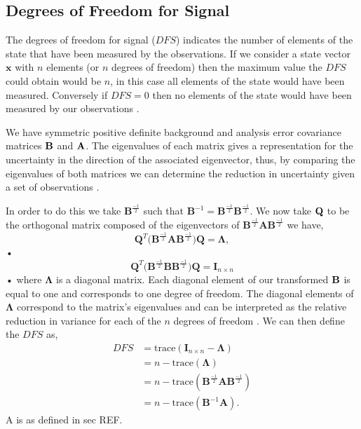 \documentclass[11pt]{article}
\begin{document}
\subsection{Degrees of Freedom for Signal} \label{DFSintro}%

The degrees of freedom for signal ($DFS$) indicates the number of elements of the state that have been measured by the observations. If we consider a state vector $\textbf{x}$ with $n$ elements (or $n$ degrees of freedom) then the maximum value the $DFS$ could obtain would be $n$, in this case all elements of the state would have been measured. Conversely if $DFS = 0$ then no elements of the state would have been measured by our observations \citep{Fowler2013}.

We have symmetric positive definite background and analysis error covariance matrices $\bf{B}$ and $\bf{A}$. The eigenvalues of each matrix gives a representation for the uncertainty in the direction of the associated eigenvector, thus, by comparing the eigenvalues of both matrices we can determine the reduction in uncertainty given a set of observations \citep{stewart2008correlated}.

In order to do this we take $\mathbf{B}^{\frac{-1}{2}}$ such that $\mathbf{B}^{-1} = \mathbf{B}^{\frac{-1}{2}}\mathbf{B}^{\frac{-1}{2}}$. We now take $\bf{Q}$ to be the orthogonal matrix composed of the eigenvectors of $\mathbf{B}^{\frac{-1}{2}}\mathbf{A}\mathbf{B}^{\frac{-1}{2}}$ we have,
\begin{equation}
\mathbf{Q}^{T}\bigg(\mathbf{B}^{\frac{-1}{2}}\mathbf{A}\mathbf{B}^{\frac{-1}{2}}\bigg)\mathbf{Q} = \bm{\Lambda},
\end{equation}• 
\begin{equation}
\mathbf{Q}^{T}\bigg(\mathbf{B}^{\frac{-1}{2}}\mathbf{B}\mathbf{B}^{\frac{-1}{2}}\bigg)\mathbf{Q} = \bm{I}_{n\times n}
\end{equation}•
where $\bm{\Lambda}$ is a diagonal matrix. Each diagonal element of our transformed $\bf{B}$ is equal to one and corresponds to one degree of freedom. The diagonal elements of $\bm{\Lambda}$ correspond to the matrix's eigenvalues and can be interpreted as the relative reduction in variance for each of the $n$ degrees of freedom \cite{singh2013practical}. We can then define the $DFS$ as,
\begin{equation}
\begin{split}
DFS & = \text{trace}(\mathbf{I}_{n\times n} - \bm{\Lambda}) \\
       & = n - \text{trace}(\bm{\Lambda}) \\
       & = n - \text{trace}(\mathbf{B}^{\frac{-1}{2}}\mathbf{A}\mathbf{B}^{\frac{-1}{2}}) \\
       & = n - \text{trace}(\mathbf{B}^{-1}\mathbf{A}).
\end{split}
\end{equation}
{\color{red} A is as defined in sec  REF}.
\end{document}
